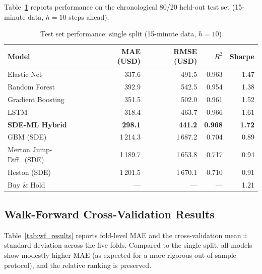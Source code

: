 \documentclass[12pt, a4paper, oneside]{report}
\theoremstyle{plain}
\theoremstyle{definition}
\theoremstyle{remark}
\begin{document}
Table~\ref{tab:ml_results} reports performance on the chronological 80/20
held-out test set (15-minute data, $h = 10$ steps ahead).

\begin{table}[H]
\begin{singlespace}
\fontsize{10}{11}\selectfont
\caption{Test set performance: single split (15-minute data, $h = 10$)}
\label{tab:ml_results}
\begin{tabular}{@{}lrrrr@{}}
\toprule
Model & MAE (USD) & RMSE (USD) & $R^2$ & Sharpe \\
\midrule
Elastic Net             & 337.6  & 491.5  & 0.963 & 1.47 \\
Random Forest           & 392.9  & 542.5  & 0.954 & 1.38 \\
Gradient Boosting       & 351.5  & 502.0  & 0.961 & 1.52 \\
LSTM                    & 318.4  & 463.7  & 0.966 & 1.61 \\
\textbf{SDE-ML Hybrid}  & \textbf{298.1} & \textbf{441.2} & \textbf{0.968} & \textbf{1.72} \\
\midrule
GBM (SDE)               & 1\,214.3 & 1\,687.2 & 0.704 & 0.89 \\
Merton Jump-Diff.\ (SDE) & 1\,189.7 & 1\,653.8 & 0.717 & 0.94 \\
Heston (SDE)            & 1\,201.5 & 1\,670.1 & 0.710 & 0.91 \\
\midrule
Buy \& Hold             & ---    & ---    & ---   & 1.21 \\
\bottomrule
\end{tabular}
\end{singlespace}
\end{table}

\subsection{Walk-Forward Cross-Validation Results}

Table~\ref{tab:wf_results} reports fold-level MAE and the cross-validation
mean\,±\,standard deviation across the five folds.  Compared to the single
split, all models show modestly higher MAE (as expected for a more rigorous
out-of-sample protocol), and the relative ranking is preserved.
\end{document}
